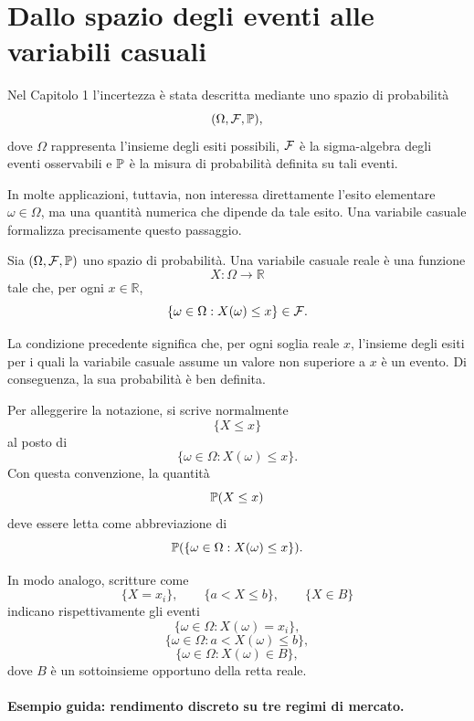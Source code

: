 \section{Dallo spazio degli eventi alle variabili casuali}

\label{sec:cap2-dallo-spazio-eventi-vc}

Nel Capitolo 1 l'incertezza \`{e} stata descritta mediante uno spazio di
probabilit\`{a}
\[
(\Omega,\mathcal{F},\mathbb{P}),
\]
dove $\Omega$ rappresenta l'insieme degli esiti possibili, $\mathcal{F}$ \`{e}
la sigma-algebra degli eventi osservabili e $\mathbb{P}$ \`{e} la misura di
probabilit\`{a} definita su tali eventi.

In molte applicazioni, tuttavia, non interessa direttamente l'esito elementare
$\omega\in\Omega$, ma una quantit\`{a} numerica che dipende da tale esito. Una
variabile casuale formalizza precisamente questo passaggio.

\begin{definition}
Sia $(\Omega,\mathcal{F},\mathbb{P})$ uno spazio di
probabilit\`{a}. Una variabile casuale reale \`{e} una funzione
\[
X:\Omega\longrightarrow\mathbb{R}
\]
tale che, per ogni $x\in\mathbb{R}$,
\[
\{\omega\in\Omega:X(\omega)\leq x\}\in\mathcal{F}.
\]

\end{definition}

La condizione precedente significa che, per ogni soglia reale $x$, l'insieme
degli esiti per i quali la variabile casuale assume un valore non superiore a
$x$ \`{e} un evento. Di conseguenza, la sua probabilit\`{a} \`{e} ben definita.

Per alleggerire la notazione, si scrive normalmente
\[
\{X\leq x\}
\]
al posto di
\[
\{\omega\in\Omega:X(\omega)\leq x\}.
\]
Con questa convenzione, la quantit\`{a}
\[
\mathbb{P}(X\leq x)
\]
deve essere letta come abbreviazione di
\[
\mathbb{P}(\{\omega\in\Omega:X(\omega)\leq x\}).
\]


In modo analogo, scritture come
\[
\{X=x_{i}\},\qquad\{a<X\leq b\},\qquad\{X\in B\}
\]
indicano rispettivamente gli eventi
\[
\{\omega\in\Omega:X(\omega)=x_{i}\},
\]
\[
\{\omega\in\Omega:a<X(\omega)\leq b\},
\]
\[
\{\omega\in\Omega:X(\omega)\in B\},
\]
dove $B$ \`{e} un sottoinsieme opportuno della retta reale.

\paragraph{Esempio guida: rendimento discreto su tre regimi di mercato.}

